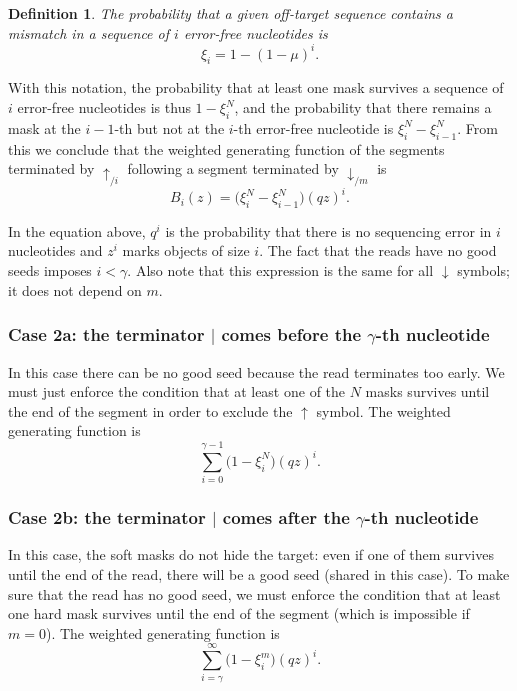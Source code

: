 \documentclass{article}
\newtheorem{definition}{Definition}
\begin{document}
\begin{definition}
The probability that a given off-target sequence contains a mismatch in a
sequence of $i$ error-free nucleotides is
\begin{equation}
\label{eq:xi}
\xi_i = 1-(1-\mu)^i.
\end{equation}
\end{definition}

With this notation, the probability that at least one mask survives a
sequence of $i$ error-free nucleotides is thus $1-\xi_i^N$, and the
probability that there remains a mask at the $i-1$-th but not at the 
$i$-th error-free nucleotide is $\xi_i^N - \xi_{i-1}^N$. From this we
conclude that the weighted generating function of the segments terminated
by $\uparrow_{/i}$ following a segment terminated by $\downarrow_{/m}$ is
\begin{equation}
\label{eq:B}
B_i(z) = \Big( \xi_i^N-\xi_{i-1}^N \Big) (qz)^i.
\end{equation}

In the equation above, $q^i$ is the probability that there is no
sequencing error in $i$ nucleotides and $z^i$ marks objects of size $i$.
The fact that the reads have no good seeds imposes $i < \gamma$. Also note
that this expression is the same for all $\downarrow$ symbols; it does not
depend on $m$.

\subsubsection*{Case 2a: the terminator $|$ comes before the $\gamma$-th
nucleotide}

In this case there can be no good seed because the read terminates too
early. We must just enforce the condition that at least one of the $N$
masks survives until the end of the segment in order to exclude the
$\uparrow$ symbol. The weighted generating function is
\begin{equation*}
\sum_{i=0}^{\gamma-1} \Big(1 - \xi_i^N \Big) (qz)^i.
\end{equation*}

\subsubsection*{Case 2b: the terminator $|$ comes after the $\gamma$-th
nucleotide}

In this case, the soft masks do not hide the target: even if one of them
survives until the end of the read, there will be a good seed (shared in
this case). To make sure that the read has no good seed, we must enforce
the condition that at least one hard mask survives until the end of the
segment (which is impossible if $m = 0$). The weighted generating function
is
\begin{equation*}
\sum_{i=\gamma}^\infty \Big(1 - \xi_i^m \Big) (qz)^i.
\end{equation*}
\end{document}
